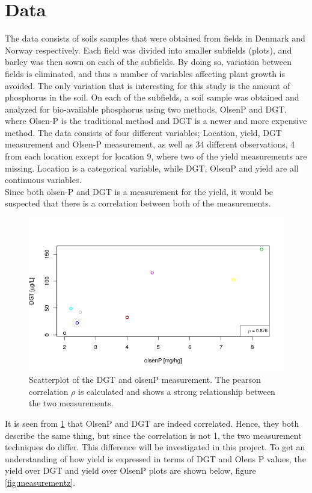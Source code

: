 \documentclass[11pt, fleqn, titlepage]{article}
\begin{document}
\section{Data}
\noindent
The data consists of soils samples that were obtained from fields in Denmark and Norway respectively. Each field was divided into smaller subfields (plots), and barley was then sown on each of the subfields. By doing so, variation between fields is eliminated, and thus a number of variables affecting plant growth is avoided. The only variation that is interesting for this study is the amount of phosphorus in the soil. On each of the subfields, a soil sample was obtained and analyzed for bio-available phosphorus using two methods, OlsenP and DGT, where Olsen-P is the traditional method and DGT is a newer and more expensive method. The data consists of four different variables; Location, yield, DGT measurement and Olsen-P measurement, as well as 34 different observations, 4 from each location except for location 9, where two of the yield measurements are missing. Location is a categorical variable, while DGT, OlsenP and yield are all continuous variables.
\\ \noindent 
Since both olsen-P and DGT is a measurement for the yield, it would be suspected that there is a correlation between both of the measurements. 
\begin{figure}[H]
	\centering
	\includegraphics[width=0.7\linewidth]{billeder/dgtolsencor.png}
	\caption{Scatterplot of the DGT and olsenP measurement. The pearson correlation $ \rho $ is calculated and shows a strong relationship between the two measurements.}
	\label{fig:dgtolsencor}
\end{figure}
\noindent It is seen from \ref{fig:dgtolsencor} that OlsenP and DGT are indeed correlated. Hence, they both describe the same thing, but since the correlation is not 1, the two measurement techniques do differ. This difference will be investigated in this project. To get an understanding of how yield is expressed in terms of DGT and Olens P values, the yield over DGT and yield over OlsenP plots are shown below, figure \ref{fig:measurementz}. 
\end{document}
